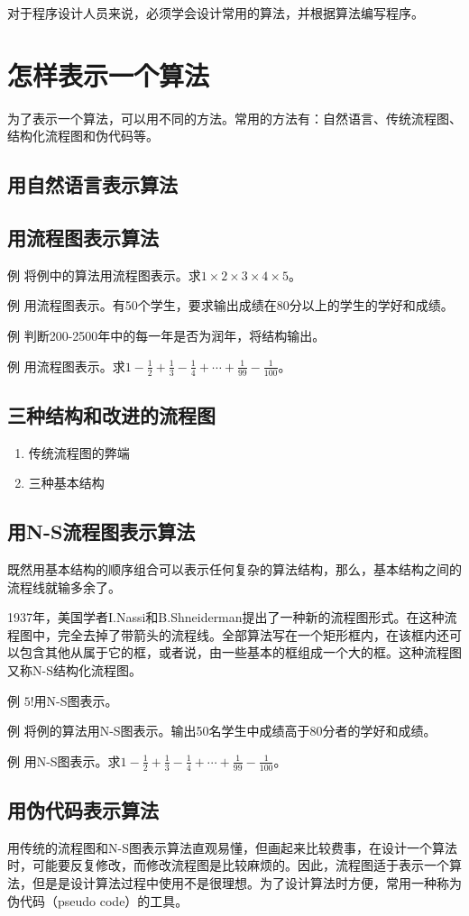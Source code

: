 对于程序设计人员来说，必须学会设计常用的算法，并根据算法编写程序。
\section{怎样表示一个算法}
为了表示一个算法，可以用不同的方法。常用的方法有：自然语言、传统流程图、结构化流程图和伪代码等。
\subsection{用自然语言表示算法}
\subsection{用流程图表示算法}
例 将例中的算法用流程图表示。求$ 1 \times 2 \times 3 \times 4 \times 5$。

例 用流程图表示。有50个学生，要求输出成绩在80分以上的学生的学好和成绩。

例 判断200-2500年中的每一年是否为润年，将结构输出。

例 用流程图表示。求$1 - \frac{1}{2} + \frac{1}{3} - \frac{1}{4} + \cdots + \frac{1}{99} - \frac{1}{100}$。
\subsection{三种结构和改进的流程图}
\begin{enumerate}
	\item 传统流程图的弊端
	\item 三种基本结构
\end{enumerate}
\subsection{用N-S流程图表示算法}
既然用基本结构的顺序组合可以表示任何复杂的算法结构，那么，基本结构之间的流程线就输多余了。

1937年，美国学者I.Nassi和B.Shneiderman提出了一种新的流程图形式。在这种流程图中，完全去掉了带箭头的流程线。全部算法写在一个矩形框内，在该框内还可以包含其他从属于它的框，或者说，由一些基本的框组成一个大的框。这种流程图又称N-S结构化流程图。

例 $5!$用N-S图表示。

例 将例的算法用N-S图表示。输出50名学生中成绩高于80分者的学好和成绩。

例 用N-S图表示。求$1 - \frac{1}{2} + \frac{1}{3} - \frac{1}{4} + \cdots + \frac{1}{99} - \frac{1}{100}$。
\subsection{用伪代码表示算法}
用传统的流程图和N-S图表示算法直观易懂，但画起来比较费事，在设计一个算法时，可能要反复修改，而修改流程图是比较麻烦的。因此，流程图适于表示一个算法，但是是设计算法过程中使用不是很理想。为了设计算法时方便，常用一种称为伪代码（pseudo code）的工具。

